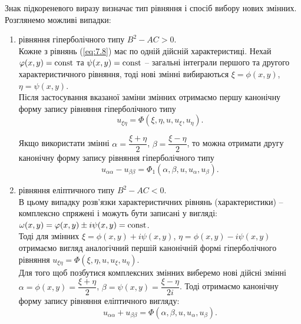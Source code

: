 Знак підкореневого виразу визначає тип рівняння і спосіб вибору нових змінних. Розглянемо можливі випадки:

\begin{enumerate}
	\item рівняння гіперболічного типу $B^2 - AC > 0$. \\

	Кожне з рівнянь (\ref{eq:7.8}) має по одній дійсній характеристиці. Нехай $\varphi(x,y)=\operatorname{const}$ та $\psi(x,y)=\operatorname{const}$ -- загальні інтеграли першого та другого характеристичного рівняння, тоді нові змінні вибираються $\xi = \phi(x, y)$, $\eta = \psi(x, y)$. \\

	Після застосування вказаної заміни змінних отримаємо першу канонічну форму запису рівняння гіперболічного типу 
	\begin{equation}
		\label{eq:7.9}
		u_{\xi\eta} = \Phi(\xi, \eta, u, u_\xi, u_\eta).
	\end{equation}

	Якщо використати змінні $\alpha = \dfrac{\xi+\eta}{2}$, $\beta = \dfrac{\xi-\eta}{2}$, то можна отримати другу канонічну форму запису рівняння гіперболічного типу
	\begin{equation}
		\label{eq:7.10}
		u_{\alpha\alpha} - u_{\beta\beta} = \Phi_1(\alpha, \beta, u, u_\alpha, u_\beta).
	\end{equation}

	\item рівняння еліптичного типу $B^2 - AC < 0$. \\

	В цьому випадку розв’язки характеристичних рівнянь (характеристики) -- комплексно спряжені і можуть бути записані у вигляді: $\omega(x,y)=\varphi(x,y)\pm i\psi(x,y)=\operatorname{const}$. \\

	Тоді для змінних $\xi = \phi(x,y) + i \psi(x, y)$, $\eta = \phi(x, y) - i \psi(x, y)$ отримаємо вигляд аналогічний першій канонічній формі гіперболічного рівняння $u_{\xi\eta}=\Phi(\xi,\eta,u,u_\xi,u_\eta)$. \\

	Для того щоб позбутися комплексних змінних виберемо нові дійсні змінні $\alpha = \phi(x,y) = \dfrac{\xi+\eta}{2}$, $\beta=\psi(x,y)=\dfrac{\xi-\eta}{2i}$. Тоді отримаємо канонічну форму запису рівняння еліптичного вигляду:
	\begin{equation}
		\label{eq:7.11}
		u_{\alpha\alpha} + u_{\beta\beta} = \Phi(\alpha,\beta,u,u_\alpha,u_\beta).
	\end{equation}


\end{enumerate}
